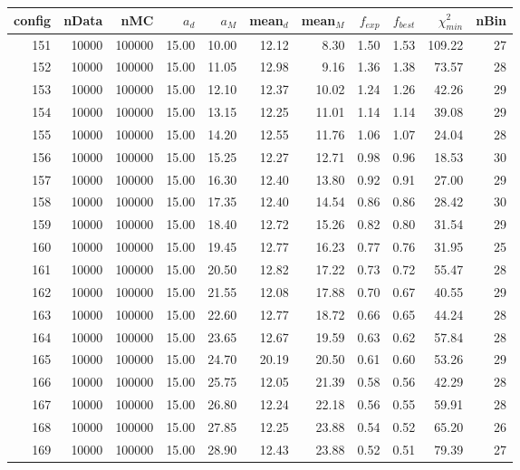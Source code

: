 \begin{table}[htp] 
\begin{center} 
\begin{tabular}{|r|rr| rr| rr| rr| rr|} 
\hline 
config& nData&   nMC& $a_d$& $a_M$&mean$_d$&mean$_M$&$f_{exp}$&$f_{best}$&$\chi^2_{min}$&  nBin \\ 
\hline 
   151& 10000&100000& 15.00& 10.00& 12.12&  8.30&  1.50&  1.53&109.22&    27 \\ 
   152& 10000&100000& 15.00& 11.05& 12.98&  9.16&  1.36&  1.38& 73.57&    28 \\ 
   153& 10000&100000& 15.00& 12.10& 12.37& 10.02&  1.24&  1.26& 42.26&    29 \\ 
   154& 10000&100000& 15.00& 13.15& 12.25& 11.01&  1.14&  1.14& 39.08&    29 \\ 
   155& 10000&100000& 15.00& 14.20& 12.55& 11.76&  1.06&  1.07& 24.04&    28 \\ 
   156& 10000&100000& 15.00& 15.25& 12.27& 12.71&  0.98&  0.96& 18.53&    30 \\ 
   157& 10000&100000& 15.00& 16.30& 12.40& 13.80&  0.92&  0.91& 27.00&    29 \\ 
   158& 10000&100000& 15.00& 17.35& 12.40& 14.54&  0.86&  0.86& 28.42&    30 \\ 
   159& 10000&100000& 15.00& 18.40& 12.72& 15.26&  0.82&  0.80& 31.54&    29 \\ 
   160& 10000&100000& 15.00& 19.45& 12.77& 16.23&  0.77&  0.76& 31.95&    25 \\ 
   161& 10000&100000& 15.00& 20.50& 12.82& 17.22&  0.73&  0.72& 55.47&    28 \\ 
   162& 10000&100000& 15.00& 21.55& 12.08& 17.88&  0.70&  0.67& 40.55&    29 \\ 
   163& 10000&100000& 15.00& 22.60& 12.77& 18.72&  0.66&  0.65& 44.24&    28 \\ 
   164& 10000&100000& 15.00& 23.65& 12.67& 19.59&  0.63&  0.62& 57.84&    28 \\ 
   165& 10000&100000& 15.00& 24.70& 20.19& 20.50&  0.61&  0.60& 53.26&    29 \\ 
   166& 10000&100000& 15.00& 25.75& 12.05& 21.39&  0.58&  0.56& 42.29&    28 \\ 
   167& 10000&100000& 15.00& 26.80& 12.24& 22.18&  0.56&  0.55& 59.91&    28 \\ 
   168& 10000&100000& 15.00& 27.85& 12.25& 23.88&  0.54&  0.52& 65.20&    26 \\ 
   169& 10000&100000& 15.00& 28.90& 12.43& 23.88&  0.52&  0.51& 79.39&    27 \\ 

\end{tabular}
\end{center}
\end{table}
